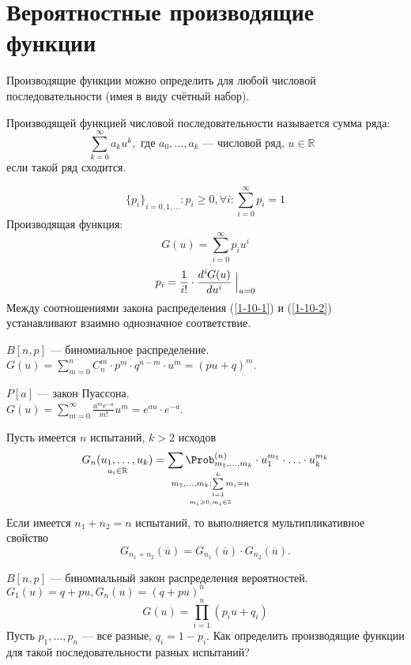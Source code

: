 \section{Вероятностные производящие функции}
Производящие функции можно определить для любой числовой последовательности (имея в виду счётный набор).
\begin{definition}
	Производящей функцией числовой последовательности называется сумма ряда:
	\[ \sum\limits_{k=0}^\infty a_k u^k, \text{ где $a_0, \dots, a_k$ --- числовой ряд, $u \in \mathbb{R}$ }\]
	если такой ряд сходится.
\end{definition}
\[
	{\{p_i\}}_{i = 0, 1, \dots} : p_i \geqslant 0, \forall i : \sum\limits_{i=0}^\infty p_i = 1
\]
\setcounter{equation}{0}
Производящая функция:
\begin{equation}\label{1-10-1}
	G(u) = \sum\limits_{i = 0}^\infty p_i u^i
\end{equation}
\begin{equation}\label{1-10-2}
	p_i = \frac{1}{i!} \cdot \frac{d^{\textit{i}} G(u)}{d u^i} \Bigm |_{u = 0}
\end{equation}
Между соотношениями закона распределения (\ref{1-10-1}) и (\ref{1-10-2}) устанавливают взаимно однозначное соответствие.
\begin{example}
	$B[n, p]$ --- биномиальное распределение. \\ $G(u) = \sum\limits_{m=0}^n C_n^m \cdot p^m \cdot q^{n-m} \cdot u^m = (pu + q)^m$.
\end{example}
\begin{example}
	$P[a]$ --- закон Пуассона. \\ $G(u) = \sum\limits_{m=0}^\infty \frac{a^m e^{-a}}{m!} u^m = e^{au} \cdot e^{-a}$.
\end{example}
Пусть имеется $n$ испытаний, $k > 2$ исходов
\[
	\underset{u_i \in \mathbb{R}}{G_n(u_1, \dots, u_k)} = \underset{ \underset{m_i \geqslant 0, m_i \in \mathbb{Z}}{m_1, \dots, m_k : \sum\limits_{i=1}^k m_i = n}} {\sum \Prob_{m_1, \dots, m_k}^{(n)}} \cdot u_1^{m_1} \cdot \ldots \cdot u_k^{m_k}
\]
Если имеется $n_1 + n_2 = n$ испытаний, то выполняется мультипликативное свойство
\[
	G_{n_1 + n_2} (\overline{u}) = G_{n_1} (\overline{u}) \cdot G_{n_2} (\overline{u}).
\]
\begin{example}
	$B[n, p]$ --- биномиальный закон распределения вероятностей. \\
	$G_1(u) = q + pu, G_n(u) = (q + pu)^n$\\
	\[
		G(u) = \prod\limits_{i=1}^n (p_i u + q_i)
	\]
	Пусть $p_1, \dots, p_n$ --- все разные, $q_i = 1 - p_i$. Как определить производящие функции для такой последовательности разных испытаний?
\end{example}
